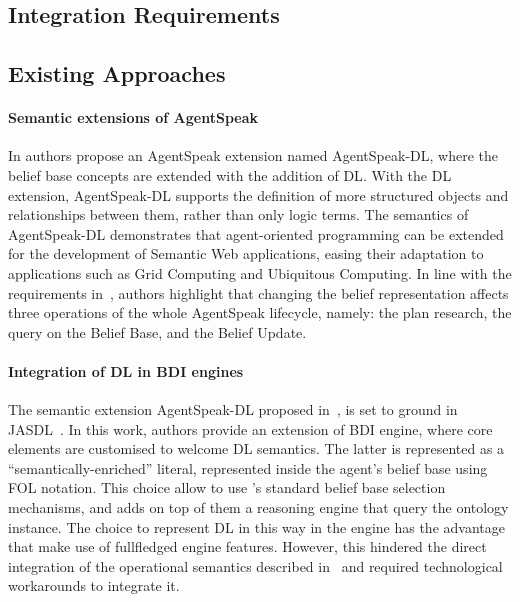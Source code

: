 \documentclass[
]{ceurart}
\begin{document}
\subsection{Integration Requirements}
\label{subsec:integration-requirements}



\subsection{Existing Approaches}

\paragraph{Semantic extensions of AgentSpeak}
In \cite{DBLP:conf/dalt/MoreiraVBH05} authors propose an AgentSpeak extension named AgentSpeak-DL, 
where the belief base concepts are extended with the addition of \ac{DL}.
%
With the \ac{DL} extension, 
AgentSpeak-DL supports the definition of more structured objects and relationships between them, 
rather than only logic terms.
%
The semantics of AgentSpeak-DL demonstrates that agent-oriented programming can be extended for the development of Semantic Web applications, 
easing their adaptation to applications such as Grid Computing and Ubiquitous Computing.
%
In line with the requirements in~, 
authors highlight that changing the belief representation affects three operations of the whole AgentSpeak lifecycle, namely: the plan research, the query on the Belief Base, and the Belief Update.

\paragraph{Integration of DL in BDI engines}
The semantic extension AgentSpeak-DL proposed in~\cite{DBLP:conf/dalt/MoreiraVBH05}, 
is set to ground in JASDL~\cite{DBLP:conf/dalt/KlapiscakB08}.
%
In this work, 
authors provide an extension of \jason{} \ac{BDI} engine, 
where core elements are customised to welcome \ac{DL} semantics.
%
The latter is represented as a ``semantically-enriched'' literal,
represented inside the agent's belief base using FOL notation.
%
This choice allow to use \jason{}'s standard belief base selection mechanisms, 
and adds on top of them a reasoning engine that query the ontology instance.
%
The choice to represent \ac{DL} in this way in the engine has the advantage that make use of fullfledged \jason{} engine features.
%
However, 
this hindered the direct integration of the operational semantics described in~\cite{DBLP:conf/dalt/KlapiscakB08} 
and required technological workarounds to integrate it.
%
\end{document}
